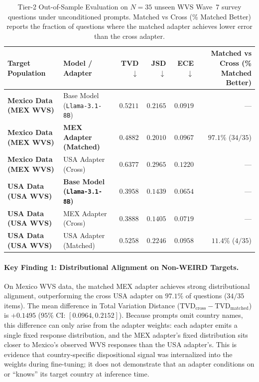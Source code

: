 \documentclass[11pt,letterpaper]{article}
\begin{document}
\begin{table}[h!]
\centering
\caption{Tier-2 Out-of-Sample Evaluation on $N=35$ unseen WVS Wave~7 survey questions under unconditioned prompts. Matched vs Cross (\% Matched Better) reports the fraction of questions where the matched adapter achieves lower error than the cross adapter.}
\label{tab:wvs_results}
\scriptsize
\begin{tabular}{@{}ll rrrr@{}}
\toprule
\textbf{Target Population} & \textbf{Model / Adapter} & \textbf{TVD $\downarrow$} & \textbf{JSD $\downarrow$} & \textbf{ECE $\downarrow$} & \textbf{Matched vs Cross (\% Matched Better)} \\
\midrule
\textbf{Mexico Data (MEX WVS)} & Base Model (\texttt{Llama-3.1-8B}) & $0.5211$ & $0.2165$ & $0.0919$ & --- \\
\textbf{Mexico Data (MEX WVS)} & \textbf{MEX Adapter (Matched)} & $\mathbf{0.4882}$ & $\mathbf{0.2010}$ & $0.0967$ & $\mathbf{97.1\%}$ ($34/35$) \\
\textbf{Mexico Data (MEX WVS)} & USA Adapter (Cross) & $0.6377$ & $0.2965$ & $0.1220$ & --- \\
\midrule
\textbf{USA Data (USA WVS)} & \textbf{Base Model (\texttt{Llama-3.1-8B})} & $\mathbf{0.3958}$ & $\mathbf{0.1439}$ & $\mathbf{0.0654}$ & --- \\
\textbf{USA Data (USA WVS)} & MEX Adapter (Cross) & $0.3888$ & $0.1405$ & $0.0719$ & --- \\
\textbf{USA Data (USA WVS)} & USA Adapter (Matched) & $0.5258$ & $0.2246$ & $0.0958$ & $11.4\%$ ($4/35$) \\
\bottomrule
\end{tabular}
\end{table}

\paragraph{Key Finding 1: Distributional Alignment on Non-WEIRD Targets.}
On Mexico WVS data, the matched MEX adapter achieves strong distributional alignment, outperforming the cross USA adapter on $97.1\%$ of questions ($34/35$ items). The mean difference in Total Variation Distance ($\text{TVD}_{\text{cross}} - \text{TVD}_{\text{matched}}$) is $+0.1495$ ($95\%$ CI: $[0.0964, 0.2152]$). Because prompts omit country names, this difference can only arise from the adapter weights: each adapter emits a single fixed response distribution, and the MEX adapter's fixed distribution sits closer to Mexico's observed WVS responses than the USA adapter's. This is evidence that country-specific dispositional signal was internalized into the weights during fine-tuning; it does not demonstrate that an adapter conditions on or ``knows'' its target country at inference time.
\end{document}
